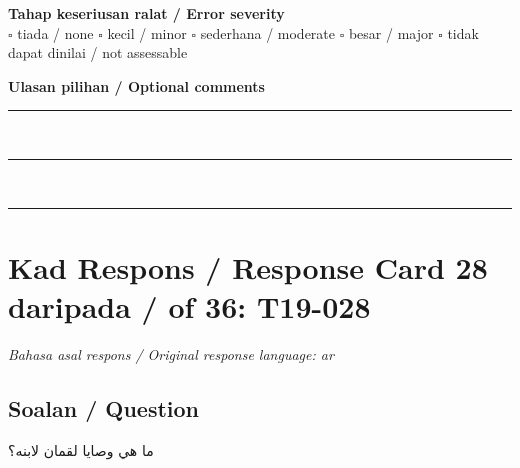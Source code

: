 \documentclass[11pt,a4paper]{article}
\newcommand{\ar}[1]{{\arabicfont #1}}
\begin{document}
\medskip
\textbf{Tahap keseriusan ralat / Error severity}\\
$\square$ tiada / none \quad $\square$ kecil / minor \quad $\square$ sederhana / moderate \quad
$\square$ besar / major \quad $\square$ tidak dapat dinilai / not assessable

\medskip
\textbf{Ulasan pilihan / Optional comments}\\[3pt]
\rule{\textwidth}{0.4pt}\\[16pt]
\rule{\textwidth}{0.4pt}\\[16pt]
\rule{\textwidth}{0.4pt}

\newpage
\section*{Kad Respons / Response Card 28 daripada / of 36: T19-028}
\textit{Bahasa asal respons / Original response language: ar}

\subsection*{Soalan / Question}
\ar{ما} \ar{هي} \ar{وصايا} \ar{لقمان} \ar{لابنه؟}
\end{document}
